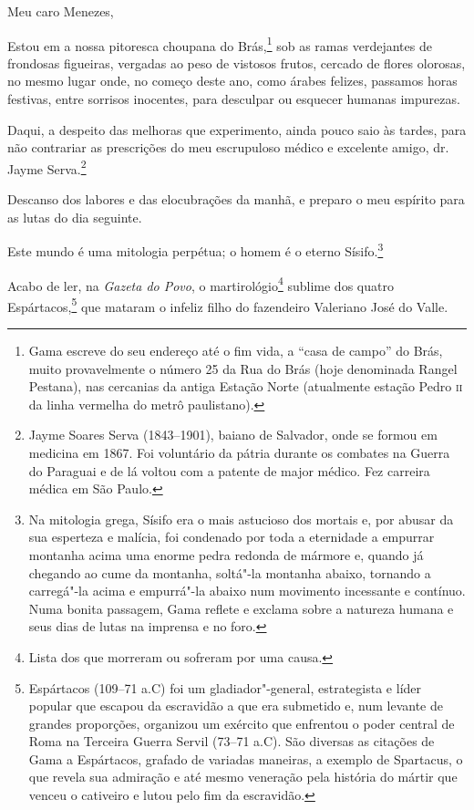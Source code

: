 \noindent{}Meu caro Menezes,\smallskip

Estou em a nossa pitoresca choupana do Brás,\footnote{Gama escreve do
  seu endereço até o fim vida, a ``casa de campo'' do Brás, muito
  provavelmente o número 25 da Rua do Brás (hoje denominada Rangel
  Pestana), nas cercanias da antiga Estação Norte (atualmente estação
  Pedro \textsc{ii} da linha vermelha do metrô paulistano).} sob as ramas
verdejantes de frondosas figueiras, vergadas ao peso de vistosos frutos,
cercado de flores olorosas, no mesmo lugar onde, no começo deste ano,
como árabes felizes, passamos horas festivas, entre sorrisos inocentes,
para desculpar ou esquecer humanas impurezas.

Daqui, a despeito das melhoras que experimento, ainda pouco saio às
tardes, para não contrariar as prescrições do meu escrupuloso médico e
excelente amigo, dr.\,Jayme Serva.\footnote{Jayme Soares Serva
  (1843--1901), baiano de Salvador, onde se formou em medicina em 1867.
  Foi voluntário da pátria durante os combates na Guerra do Paraguai e
  de lá voltou com a patente de major médico. Fez carreira médica em São
  Paulo.}

Descanso dos labores e das elocubrações da manhã, e preparo o meu
espírito para as lutas do dia seguinte.

Este mundo é uma mitologia perpétua; o homem é o eterno Sísifo.\footnote{
  Na mitologia grega, Sísifo era o mais astucioso dos mortais e, por
  abusar da sua esperteza e malícia, foi condenado por toda a eternidade
  a empurrar montanha acima uma enorme pedra redonda de mármore e,
  quando já chegando ao cume da montanha, soltá"-la montanha abaixo,
  tornando a carregá"-la acima e empurrá"-la abaixo num movimento
  incessante e contínuo. Numa bonita passagem, Gama reflete e exclama
  sobre a natureza humana e seus dias de lutas na imprensa e no foro.}

Acabo de ler, na \emph{Gazeta do Povo}, o martirológio\footnote{Lista
  dos que morreram ou sofreram por uma causa.} sublime dos quatro
Espártacos,\footnote{Espártacos (109--71 a.C) foi um \label{espartacos}
  gladiador"-general, estrategista e líder popular que escapou da
  escravidão a que era submetido e, num levante de grandes proporções,
  organizou um exército que enfrentou o poder central de Roma na
  Terceira Guerra Servil (73--71 a.C). São diversas as citações de
  Gama a Espártacos, grafado de variadas maneiras, a exemplo de
  Spartacus, o que revela sua admiração e até mesmo veneração pela
  história do mártir que venceu o cativeiro e lutou pelo fim da
  escravidão.} que mataram o infeliz filho do fazendeiro Valeriano José
do Valle.

